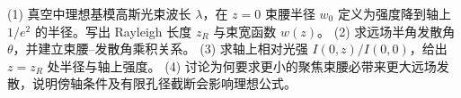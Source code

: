 (1) 真空中理想基模高斯光束波长 \(\lambda\)，在 \(z=0\) 束腰半径 \(w_0\) 定义为强度降到轴上 \(1/e^2\) 的半径。写出 Rayleigh 长度 \(z_R\) 与束宽函数 \(w(z)\)。
(2) 求远场半角发散角 \(\theta\)，并建立束腰–发散角乘积关系。
(3) 求轴上相对光强 \(I(0,z)/I(0,0)\)，给出 \(z=z_R\) 处半径与轴上强度。
(4) 讨论为何要求更小的聚焦束腰必带来更大远场发散，说明傍轴条件及有限孔径截断会影响理想公式。
